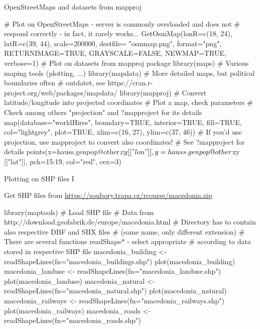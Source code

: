 \documentclass[compress, ucs, xelatex, 11pt, xcolor=svgnames,
  hyperref={
    bookmarks=true,
    unicode=true,
    colorlinks=true,
    pdftitle={Molecular data in R},
    plainpages=false,
    pdfauthor={Vojtech Zeisek},
    pdfsubject={Course about phylogeny and evolution in R},
    pdfcreator={XeLaTeX},
    pdfkeywords={R, evolution, phylogeny, molecular data},
    linkcolor=Tomato,
    anchorcolor=SaddleBrown,
    citecolor=Goldenrod,
    filecolor=DarkMagenta,
    menucolor=Sienna,
    urlcolor=DarkTurquoise,
    pdftex},
  url={hyphens, lowtilde} %
  ]{beamer}
\begin{document}
\begin{frame}[fragile]{OpenStreetMaps and datasets from mapproj}
  \begin{spluscode}
    # Plot on OpenStreetMaps - server is commonly overloaded and does not
    # respond correctly - in fact, it rarely works...
    GetOsmMap(lonR=c(18, 24), latR=c(39, 44), scale=200000, destfile=
      "osmmap.png", format="png", RETURNIMAGE=TRUE, GRAYSCALE=FALSE,
      NEWMAP=TRUE, verbose=1)
    # Plot on datasets from mapproj package
    library(maps) # Various maping tools (plotting, ...)
    library(mapdata) # More detailed maps, but political boundaries often
           # outdatet, see https://cran.r-project.org/web/packages/mapdata/
    library(mapproj) # Convert latitude/longitude into projected coordinates
    # Plot a map, check parameters
    # Check among others "projection" and ?mapproject for its details
    map(database="worldHires", boundary=TRUE, interior=TRUE, fill=TRUE,
      col="lightgrey", plot=TRUE, xlim=c(16, 27), ylim=c(37, 46))
    # If you'd use projection, use mapproject to convert also coordinates!
    # See ?mapproject for details
    points(x=hauss.genpop@other$xy[["lon"]], y=hauss.genpop@other$xy
      [["lat"]], pch=15:19, col="red", cex=3)
  \end{spluscode}
\end{frame}

\begin{frame}[fragile]{Plotting on SHP files I}
  \begin{scriptsize}
    Get SHP files from \url{https://soubory.trapa.cz/rcourse/macedonia.zip}
  \end{scriptsize}
  \begin{spluscode}
    library(maptools)
    # Load SHP file
    # Data from http://download.geofabrik.de/europe/macedonia.html
    # Directory has to contain also respective DBF and SHX files
    # (same name, only different extension)
    # There are several functions readShape* - select appropriate
    # according to data stored in respective SHP file
    macedonia_building <- readShapeLines(fn="macedonia_buildings.shp")
    plot(macedonia_building)
    macedonia_landuse <- readShapeLines(fn="macedonia_landuse.shp")
    plot(macedonia_landuse)
    macedonia_natural <- readShapeLines(fn="macedonia_natural.shp")
    plot(macedonia_natural)
    macedonia_railways <- readShapeLines(fn="macedonia_railways.shp")
    plot(macedonia_railways)
    macedonia_roads <- readShapeLines(fn="macedonia_roads.shp")
  \end{spluscode}
\end{frame}
\end{document}
